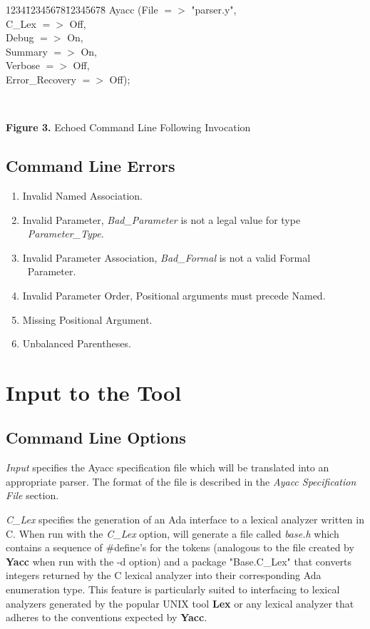 \begin{tabbing}
1234\=12345678\=12345678\= \kill
\>  Ayacc (\>File\>      $=>$ "parser.y",\\
\>\>         C\_Lex     $=>$ Off,\\
\>\>         Debug     $=>$ On,\\
\>\>         Summary   $=>$ On,\\
\>\>         Verbose   $=>$ Off,\\
\>\>         Error\_Recovery   $=>$ Off);\\
\end{tabbing}
\hspace{-0.05in}\hrulefill\hspace{0.0in}\\
\centerline{{\bf Figure 3.} Echoed Command Line Following Invocation}
\subsection{Command Line Errors}
{\bf
\begin{enumerate}
\item Invalid Named Association.
\item Invalid Parameter, {\it Bad\_Parameter} is not a legal value for type \
{\it Parameter\_Type}.
\item Invalid Parameter Association, {\it Bad\_Formal} is not a valid Formal \
Parameter.
\item Invalid Parameter Order, Positional arguments must precede Named.
\item Missing Positional Argument.
\item Unbalanced Parentheses.
\end{enumerate}
}
\section{Input to the Tool}
\subsection{Command Line Options}
{\it Input} specifies the Ayacc specification file which will be translated
into an appropriate parser.  The format of the file is described in the
{\it Ayacc Specification File} section.

{\it C\_Lex} specifies the generation of an Ada interface 
to a lexical analyzer written in C.  When run
with the {\it C\_Lex} option, \ayacc will generate a file called
{\it base.h}
which contains a sequence of \#define's for the tokens
(analogous to the file created by {\bf Yacc} when run with the -d option)
and a package "Base.C\_Lex" that converts integers returned by the C lexical
analyzer into their corresponding Ada enumeration type.  This feature
is particularly suited to interfacing to
lexical analyzers generated
by the popular UNIX tool {\bf Lex} or any lexical analyzer that adheres
to the conventions expected by {\bf Yacc}.

